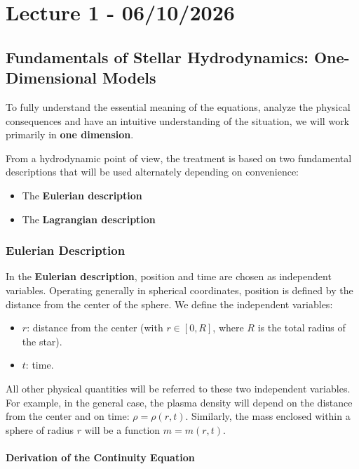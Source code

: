 \chapter{Lecture 1 - 06/10/2026}

\section{Fundamentals of Stellar Hydrodynamics: One-Dimensional Models}

To fully understand the essential meaning of the equations, analyze the physical consequences and have an intuitive understanding of the situation, we will work primarily in \textbf{one dimension}.

From a hydrodynamic point of view, the treatment is based on two fundamental descriptions that will be used alternately depending on convenience:
\begin{itemize}
\item The \textbf{Eulerian description}
\item The \textbf{Lagrangian description}
\end{itemize}

\subsection{Eulerian Description}

In the \textbf{Eulerian description}, position and time are chosen as independent variables. Operating generally in spherical coordinates, position is defined by the distance from the center of the sphere. We define the independent variables:
\begin{itemize}
\item $r$: distance from the center (with $r \in [0, R]$, where $R$ is the total radius of the star).
\item $t$: time.
\end{itemize}

All other physical quantities will be referred to these two independent variables. For example, in the general case, the plasma density will depend on the distance from the center and on time: $\rho = \rho(r,t)$. Similarly, the mass enclosed within a sphere of radius $r$ will be a function $m = m(r,t)$.

\subsubsection{Derivation of the Continuity Equation}

